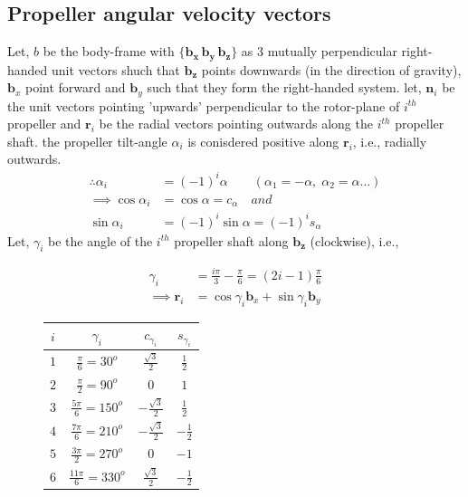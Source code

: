 \subsection{Propeller angular velocity vectors}
Let, $b$ be the body-frame with $\{\pmb{b_x \, b_y \, b_z}\}$ as 3 mutually perpendicular right-handed unit vectors shuch that $\pmb{b_z}$ points downwards (in the direction of gravity), $\pmb{b}_x$ point forward and $\pmb{b}_y$ such that they form the right-handed system. let, $\pmb{n}_i$ be the unit vectors pointing 'upwards' perpendicular to the rotor-plane of $i^{th}$ propeller and $\pmb{r}_i$ be the radial vectors pointing outwards along the $i^{th}$ propeller shaft. the propeller tilt-angle $\alpha_i$ is conisdered positive along $\pmb{r}_i$, i.e., radially outwards.
\begin{align*}
   \therefore \alpha_i &= (-1)^{i} \alpha \qquad (\alpha_1 = -\alpha, \; \alpha_2 = \alpha \hdots) \\
   \implies \cos \alpha_i &= \cos \alpha  = c_{\alpha} \quad and\\
   \sin \alpha_i &= (-1)^{i} \sin \alpha = (-1)^{i} s_{\alpha}
\end{align*}
Let, $\gamma_i$ be the angle of the $i^{th}$ propeller shaft along $\pmb{b_z}$ (clockwise), i.e.,
\begin{figure}[H]
    \begin{minipage}{0.49 \textwidth}
            \begin{align*}
            \gamma_i &= \frac{i\pi}{3} - \frac{\pi}{6} = (2i-1)\frac{\pi}{6}\\
            \implies \pmb r_i &= \cos \gamma_i \pmb b_x + \sin \gamma_i \pmb b_y
            \end{align*}
    \end{minipage}
    \begin{minipage}{0.49 \textwidth}
        \begin{table}[H]
            \centering
            \begin{tabular}{c c c c }
                \hline \hline
                $i$ & $\gamma_i$ & $c_{\gamma_i}$ & $s_{\gamma_i}$ \\ \hline \hline
                $1$ & $\frac{\pi}{6} = 30^o$   & $\frac{\sqrt{3}}{2}$ & $\frac{1}{2}$ \\
                $2$ & $\frac{\pi}{2} = 90^o$   & $0$ & $1$ \\
                $3$ & $\frac{5\pi}{6} = 150^o$ & $-\frac{\sqrt{3}}{2}$ & $\frac{1}{2}$ \\
                $4$ & $\frac{7\pi}{6} = 210^o$ & $-\frac{\sqrt{3}}{2}$ & $-\frac{1}{2}$ \\
                $5$ & $\frac{3\pi}{2} = 270^o$ & 0 & $-1$ \\
                $6$ & $\frac{11\pi}{6} = 330^o$& $\frac{\sqrt{3}}{2}$ & $-\frac{1}{2}$ \\
                \hline \hline
            \end{tabular}
        \end{table}
    \end{minipage}
\end{figure}
